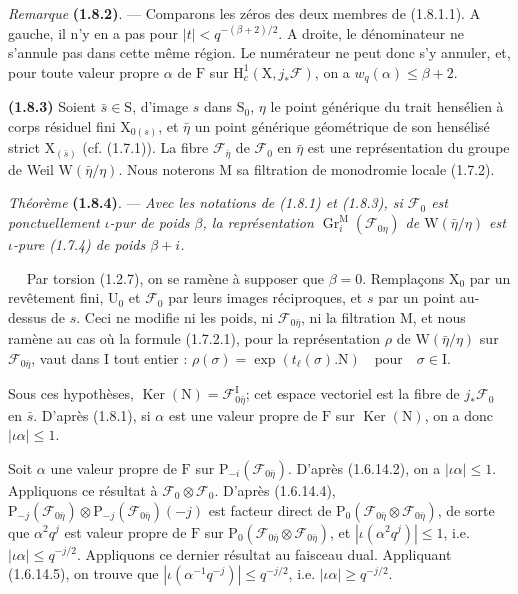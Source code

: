 \documentclass[11pt,leqno]{article}
\newcommand{\Page}[1]{\ifvmode\noindent\else\unskip\ \fi{\footnotesize\textcolor{gray}{[p.\,#1]}}\ \ignorespaces}
\begin{document}
\textit{Remarque} \textbf{(1.8.2)}. — Comparons les zéros des deux membres de (1.8.1.1). A gauche, il n’y en a pas pour \(|t|<q^{-(\beta+2)/2}\). A droite, le dénominateur ne s’annule pas dans cette même région. Le numérateur ne peut donc s’y annuler, et, pour toute valeur propre \(\alpha\) de \(\mathrm{F}\) sur \(\mathrm{H}_c^1(\mathrm{X},j_*\mathscr{F})\), on a \(w_q(\alpha)\leq\beta+2\).

\textbf{(1.8.3)} Soient \(\bar{s}\in\mathrm{S}\), d’image \(s\) dans \(\mathrm{S}_0\), \(\eta\) le point générique du trait hensélien à corps résiduel fini \(\mathrm{X}_{0(s)}\), et \(\bar{\eta}\) un point générique géométrique de son hensélisé strict \(\mathrm{X}_{(\bar{s})}\) (cf. (1.7.1)). La fibre \(\mathscr{F}_{\bar{\eta}}\) de \(\mathscr{F}_0\) en \(\bar{\eta}\) est une représentation du groupe de Weil \(\mathrm{W}(\bar{\eta}/\eta)\). Nous noterons \(\mathrm{M}\) sa filtration de monodromie locale (1.7.2).

\textit{Théorème} \textbf{(1.8.4)}. — \textit{Avec les notations de \textup{(1.8.1)} et \textup{(1.8.3)}, si \(\mathscr{F}_0\) est ponctuellement \(\iota\)-pur de poids \(\beta\), la représentation \(\operatorname{Gr}_i^{\mathrm{M}}(\mathscr{F}_{0\eta})\) de \(\mathrm{W}(\bar{\eta}/\eta)\) est \(\iota\)-pure \textup{(1.7.4)} de poids \(\beta+i\).}

\Page{176}
Par torsion (1.2.7), on se ramène à supposer que \(\beta=0\). Remplaçons \(\mathrm{X}_0\) par un revêtement fini, \(\mathrm{U}_0\) et \(\mathscr{F}_0\) par leurs images réciproques, et \(s\) par un point au-dessus de \(s\). Ceci ne modifie ni les poids, ni \(\mathscr{F}_{0\bar{\eta}}\), ni la filtration \(\mathrm{M}\), et nous ramène au cas où la formule (1.7.2.1), pour la représentation \(\rho\) de \(\mathrm{W}(\bar{\eta}/\eta)\) sur \(\mathscr{F}_{0\bar{\eta}}\), vaut dans \(\mathrm{I}\) tout entier :
\(\rho(\sigma)=\exp(t_\ell(\sigma).\mathrm{N})\quad\text{pour}\quad\sigma\in\mathrm{I}\).

Sous ces hypothèses, \(\operatorname{Ker}(\mathrm{N})=\mathscr{F}_{0\bar{\eta}}^{\mathrm{I}}\); cet espace vectoriel est la fibre de \(j_*\mathscr{F}_0\) en \(\bar{s}\). D’après (1.8.1), si \(\alpha\) est une valeur propre de \(\mathrm{F}\) sur \(\operatorname{Ker}(\mathrm{N})\), on a donc \(|\iota\alpha|\leq1\).

Soit \(\alpha\) une valeur propre de \(\mathrm{F}\) sur \(\mathrm{P}_{-i}(\mathscr{F}_{0\bar{\eta}})\). D’après (1.6.14.2), on a \(|\iota\alpha|\leq1\). Appliquons ce résultat à \(\mathscr{F}_0\otimes\mathscr{F}_0\). D’après (1.6.14.4), \(\mathrm{P}_{-j}(\mathscr{F}_{0\bar{\eta}})\otimes\mathrm{P}_{-j}(\mathscr{F}_{0\bar{\eta}})(-j)\) est facteur direct de \(\mathrm{P}_0(\mathscr{F}_{0\bar{\eta}}\otimes\mathscr{F}_{0\bar{\eta}})\), de sorte que \(\alpha^2q^j\) est valeur propre de \(\mathrm{F}\) sur \(\mathrm{P}_0(\mathscr{F}_{0\bar{\eta}}\otimes\mathscr{F}_{0\bar{\eta}})\), et \(|\iota(\alpha^2q^j)|\leq1\), i.e. \(|\iota\alpha|\leq q^{-j/2}\). Appliquons ce dernier résultat au faisceau dual. Appliquant (1.6.14.5), on trouve que \(|\iota(\alpha^{-1}q^{-j})|\leq q^{-j/2}\), i.e. \(|\iota\alpha|\geq q^{-j/2}\).
\end{document}
